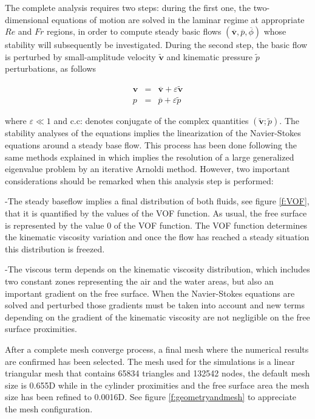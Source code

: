 \documentclass[%
 reprint,
 amsmath,amssymb,
 aps,
prl
]{revtex4-1}
\begin{document}
The complete analysis requires two steps: during the first one, the two-dimensional equations of motion are solved in the laminar regime at appropriate $Re$ and $Fr$ regions, in order to compute steady basic flows $(\overline{\mathbf{v}}, \overline{p},\overline{\phi})$ whose stability will subsequently be investigated. During the second step, the basic flow is perturbed by small-amplitude velocity $\widetilde{\mathbf{v}}$ and kinematic pressure $\widetilde{p}$ perturbations, as follows

\begin{eqnarray}
  \mathbf{v} &=& \overline{\mathbf{v}} + \varepsilon \widetilde{\mathbf{v}} \\
  p &=& \overline{p} + \varepsilon \widetilde{p}
\end{eqnarray}

where $\varepsilon\ll 1$ and c.c: denotes conjugate of the complex quantities $(\widetilde{\mathbf{v}}; \widetilde{p})$. The stability analyses of the equations implies the linearization of the Navier-Stokes equations around a steady base flow. This process has been done following the same methods explained in \cite{Gonzalez07} which implies the resolution of a large generalized eigenvalue problem by an iterative Arnoldi method. However, two important considerations should be remarked when this analysis step is performed:

-The steady baseflow implies a final distribution of both fluids, see figure \ref{f:VOF}, that it is quantified by the values of the VOF function. As usual, the free surface is represented by the value 0 of the VOF function. The VOF function determines the kinematic viscosity variation and once the flow has reached a steady situation this distribution is freezed.

-The viscous term depends on the kinematic viscosity distribution, which includes two constant zones representing the air and the water areas, but also an important gradient on the free surface. When the Navier-Stokes equations are solved and perturbed those gradients must be taken into account and new terms depending on the gradient of the kinematic viscosity are not negligible on the free surface proximities.


After a complete mesh converge process, a final mesh where the numerical results are confirmed has been selected. The mesh used for the simulations is a linear triangular mesh that contains 65834 triangles and 132542 nodes, the default mesh size is 0.655D while in the cylinder proximities and the free surface area the mesh size has been refined to 0.0016D. See figure \ref{f:geometryandmesh} to appreciate the mesh configuration.
\end{document}
